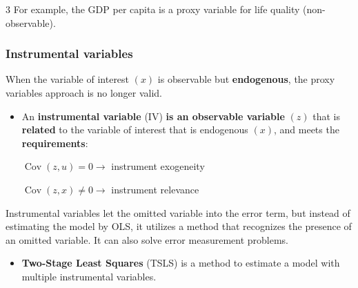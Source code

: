 \documentclass[10pt, a4paper, landscape]{article}
\DeclareMathOperator{\Cov}{Cov}
\begin{document}
\begin{multicols}{3}
For example, the GDP per capita is a proxy variable for life quality (non-observable).

\subsubsection*{Instrumental variables}

When the variable of interest \( (x) \) is observable but \textbf{endogenous}, the proxy variables approach is no longer valid.

\begin{itemize}[leftmargin=*]
	\item An \textbf{instrumental variable} (IV) \textbf{is an observable variable} \( (z) \) that is \textbf{related} to the variable of interest that is endogenous \( (x) \), and meets the \textbf{requirements}:
	\begin{center}
		\( \Cov(z, u) = 0 \rightarrow \) instrument exogeneity

		\( \Cov(z, x) \neq 0 \rightarrow \) instrument relevance
	\end{center}
\end{itemize}

Instrumental variables let the omitted variable into the error term, but instead of estimating the model by OLS, it utilizes a method that recognizes the presence of an omitted variable. It can also solve error measurement problems.

\begin{itemize}[leftmargin=*]
	\item \textbf{Two-Stage Least Squares} (TSLS) is a method to estimate a model with multiple instrumental variables.


\end{itemize}
\end{multicols}
\end{document}
